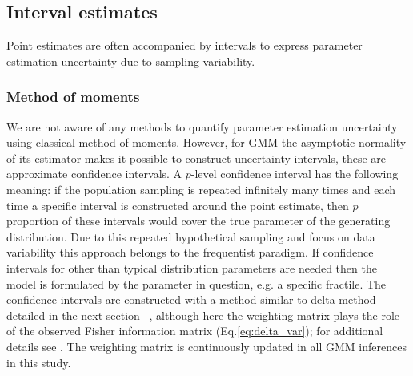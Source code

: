 \subsection{Interval estimates}
\label{sec:interval_estimates}


Point estimates are often accompanied by intervals to express parameter estimation uncertainty due to sampling variability.


\subsubsection*{Method of moments}
We are not aware of any methods to quantify parameter estimation uncertainty using classical method of moments. However, for GMM the asymptotic normality of its estimator makes it possible to construct uncertainty intervals, these are approximate confidence intervals. A $p$-level confidence interval has the following meaning: if the population sampling is repeated infinitely many times and each time a specific interval is constructed around the point estimate, then $p$ proportion of these intervals would cover the true parameter of the generating distribution. Due to this repeated hypothetical sampling and focus on data variability this approach belongs to the frequentist paradigm. If confidence intervals for other than typical distribution parameters are needed then the model is formulated by the parameter in question, e.g. a specific fractile. The confidence intervals are constructed with a method similar to delta method -- detailed in the next section --, although here the weighting matrix plays the role of the observed Fisher information matrix (Eq.\ref{eq:delta_var}); for additional details see \citet{Chausse2010}. The weighting matrix is continuously updated in all GMM inferences in this study.


